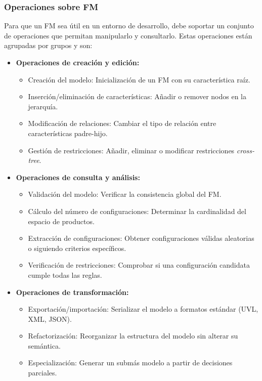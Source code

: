 \subsubsection{Operaciones sobre \ac{FM}}

Para que un \ac{FM} sea útil en un entorno de desarrollo, debe soportar un conjunto de 
operaciones que permitan manipularlo y consultarlo. Estas operaciones están agrupadas por
grupos y son:

\begin{itemize}
    \item \textbf{Operaciones de creación y edición:}
    \begin{itemize}
        \item Creación del modelo: Inicialización de un \ac{FM} con su característica raíz.
        \item Inserción/eliminación de características: Añadir o remover nodos en la jerarquía.
        \item Modificación de relaciones: Cambiar el tipo de relación entre características padre-hijo.
        \item Gestión de restricciones: Añadir, eliminar o modificar restricciones \textit{cross-tree}.
    \end{itemize}
    
    \item \textbf{Operaciones de consulta y análisis:}
    \begin{itemize}
        \item Validación del modelo: Verificar la consistencia global del \ac{FM}.
        \item Cálculo del número de configuraciones: Determinar la cardinalidad del espacio de productos.
        \item Extracción de configuraciones: Obtener configuraciones válidas aleatorias o siguiendo criterios específicos.
        \item Verificación de restricciones: Comprobar si una configuración candidata cumple todas las reglas.
    \end{itemize}
    
    \item \textbf{Operaciones de transformación:}
    \begin{itemize}
        \item Exportación/importación: Serializar el modelo a formatos estándar (UVL, XML, JSON).
        \item Refactorización: Reorganizar la estructura del modelo sin alterar su semántica.
        \item Especialización: Generar un submás modelo a partir de decisiones parciales.
    \end{itemize}
\end{itemize}


